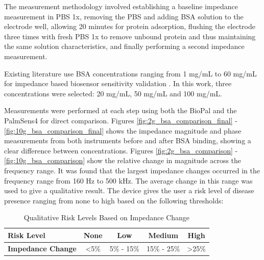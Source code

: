 The measurement methodology involved establishing a baseline impedance measurement in PBS 1x, removing the PBS and adding BSA solution to the electrode well, allowing 20 minutes for protein adsorption, flushing the electrode three times with fresh PBS 1x to remove unbound protein and thus maintaining the same solution characteristics, and finally performing a second impedance measurement.

Existing literature use BSA concentrations ranging from 1 mg/mL to 60 mg/mL for impedance based biosensor sensitivity validation \cite{maImpedancebasedIntegratedBiosensor2013}\cite{ebadiPolypyrrolebasedBovineSerum2025}. In this work, three concentrations were selected: 20 mg/mL, 50 mg/mL and 100 mg/mL.

Measurements were performed at each step using both the BioPal and the PalmSens4 for direct comparison. Figures \ref{fig:2g_bsa_comparison_final} - \ref{fig:10g_bsa_comparison_final} shows the impedance magnitude and phase measurements from both instruments before and after BSA binding, showing a clear difference between concentrations. Figures \ref{fig:2g_bsa_comparison} - \ref{fig:10g_bsa_comparison} show the relative change in magnitude across the frequency range. It was found that the largest impedance changes occurred in the frequency range from 160 Hz to 500 kHz. The average change in this range was used to give a qualitative result. The device gives the user a risk level of disease presence ranging from none to high based on the following thresholds:
\begin{table}[H]
\centering
\caption{Qualitative Risk Levels Based on Impedance Change}
\label{tab:risk_levels}
\begin{tabular}{lcccc}
\hline
\textbf{Risk Level} & \textbf{None} & \textbf{Low} & \textbf{Medium} & \textbf{High} \\
\hline
\textbf{Impedance Change} & \textless 5\% & 5\% - 15\% & 15\% - 25\% & \textgreater 25\% \\
\hline
\end{tabular}
\end{table}

